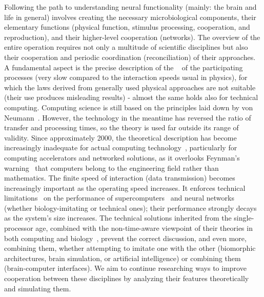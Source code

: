 Following the path to understanding neural functionality (mainly: the brain and life in general) involves creating the necessary microbiological components,
their elementary functions (physical function, stimulus processing, cooperation, and reproduction), and their higher-level cooperation (networks). 
The overview of the entire operation requires not only a multitude of scientific disciplines but also their cooperation and periodic coordination (reconciliation) of their approaches. 
A fundamental aspect is the precise description of the ~\cite{RoleOfInformationTransferSpeed:2022} of the participating processes (very slow compared to the interaction speeds usual in physics),
for which the laws derived from generally used physical approaches are not suitable (their use produces misleading results) - almost the same holds also for technical computing.
Computing science is still based on the principles laid down by von Neumann~\cite{EDVACreport1945}.
 However, the technology in the meantime has reversed the ratio of transfer and processing times, so the theory is used far outside its range of validity.
Since approximately 2000, the theoretical description has become increasingly inadequate for actual computing technology~\cite{VeghTechnomorphBiology:2025}, particularly for computing accelerators and networked solutions, as it overlooks Feynman’s
 warning~\cite{FeynmanComputation:2018} that computers belong to the engineering field rather than mathematics. The finite  speed of interaction (data transmission) becomes increasingly important as the operating speed increases.
It enforces technical limitations~\cite{VeghRevisingClassicComputing:2021,VeghTechnomorphBiology:2025} on the performance of supercomputers~\cite{VeghHowMany:2020} and neural networks~\cite{VeghScalingANN:2021} (whether biology-imitating or technical ones); their performance strongly decays as the system’s size increases.
The technical solutions inherited from the single-processor age, combined with the non-time-aware viewpoint of their theories in both computing and biology~\cite{VeghTechnomorphBiology:2025}, prevent the correct discussion, and even more, combining them, whether attempting to imitate one with the other (biomorphic architectures, brain simulation, or artificial intelligence) or combining them (brain-computer interfaces).
We aim to continue researching ways to improve cooperation between these disciplines by analyzing their features theoretically and simulating them.




